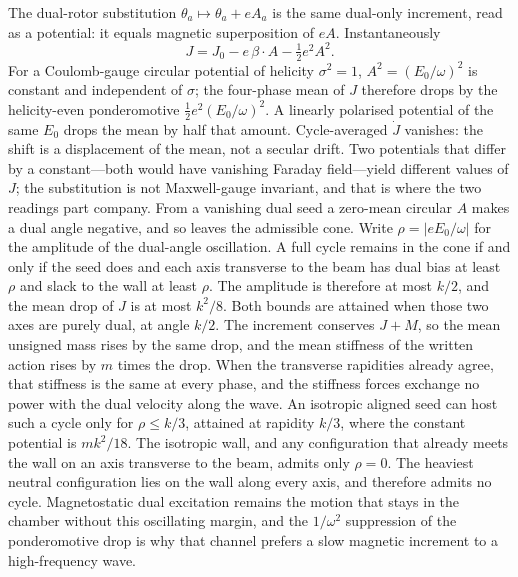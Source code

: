 \documentclass[a4paper]{article}
\begin{document}
The dual-rotor substitution $\theta_a\mapsto\theta_a+e A_a$ is the same dual-only increment, read as a potential: it equals magnetic superposition of $eA$. Instantaneously
\begin{equation}
\label{eq:ponderomotive-J}
J=J_0-e\,\beta\cdot A-\tfrac12 e^2 A^2.
\end{equation}
For a Coulomb-gauge circular potential of helicity $\sigma^2=1$, $A^2=(E_0/\omega)^2$ is constant and independent of $\sigma$; the four-phase mean of $J$ therefore drops by the helicity-even ponderomotive $\tfrac12 e^2(E_0/\omega)^2$. A linearly polarised potential of the same $E_0$ drops the mean by half that amount. Cycle-averaged $\dot J$ vanishes: the shift is a displacement of the mean, not a secular drift. Two potentials that differ by a constant---both would have vanishing Faraday field---yield different values of $J$; the substitution is not Maxwell-gauge invariant, and that is where the two readings part company. From a vanishing dual seed a zero-mean circular $A$ makes a dual angle negative, and so leaves the admissible cone. Write $\rho=|e E_0/\omega|$ for the amplitude of the dual-angle oscillation. A full cycle remains in the cone if and only if the seed does and each axis transverse to the beam has dual bias at least $\rho$ and slack to the wall at least $\rho$. The amplitude is therefore at most $k/2$, and the mean drop of $J$ is at most $k^2/8$. Both bounds are attained when those two axes are purely dual, at angle $k/2$. The increment conserves $J+M$, so the mean unsigned mass rises by the same drop, and the mean stiffness of the written action rises by $m$ times the drop. When the transverse rapidities already agree, that stiffness is the same at every phase, and the stiffness forces exchange no power with the dual velocity along the wave. An isotropic aligned seed can host such a cycle only for $\rho\le k/3$, attained at rapidity $k/3$, where the constant potential is $mk^2/18$. The isotropic wall, and any configuration that already meets the wall on an axis transverse to the beam, admits only $\rho=0$. The heaviest neutral configuration lies on the wall along every axis, and therefore admits no cycle. Magnetostatic dual excitation remains the motion that stays in the chamber without this oscillating margin, and the $1/\omega^2$ suppression of the ponderomotive drop is why that channel prefers a slow magnetic increment to a high-frequency wave.
\end{document}
